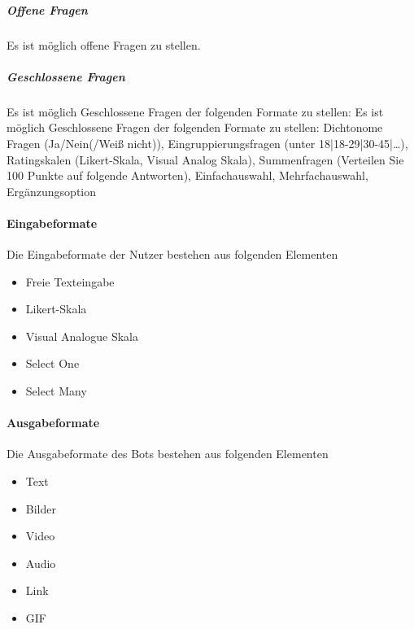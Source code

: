 \subparagraph{Offene Fragen} Es ist möglich offene Fragen zu stellen.
\subparagraph{Geschlossene Fragen} Es ist möglich Geschlossene Fragen der folgenden Formate zu stellen: Es ist möglich Geschlossene Fragen der folgenden Formate zu stellen: Dichtonome Fragen (Ja/Nein(/Weiß nicht)), Eingruppierungsfragen (unter 18|18-29|30-45|…), Ratingskalen (Likert-Skala, Visual Analog Skala), Summenfragen (Verteilen Sie 100 Punkte auf folgende Antworten), Einfachauswahl, Mehrfachauswahl, Ergänzungsoption


\paragraph{Eingabeformate} Die Eingabeformate der Nutzer	bestehen aus folgenden Elementen
\begin{itemize}
\item Freie Texteingabe
\item Likert-Skala
\item Visual Analogue Skala
\item Select One
\item Select Many
\end{itemize}

\paragraph{Ausgabeformate} Die Ausgabeformate des Bots bestehen aus folgenden Elementen
\begin{itemize}
\item Text
\item Bilder
\item Video
\item Audio
\item Link
\item GIF
\end{itemize}

